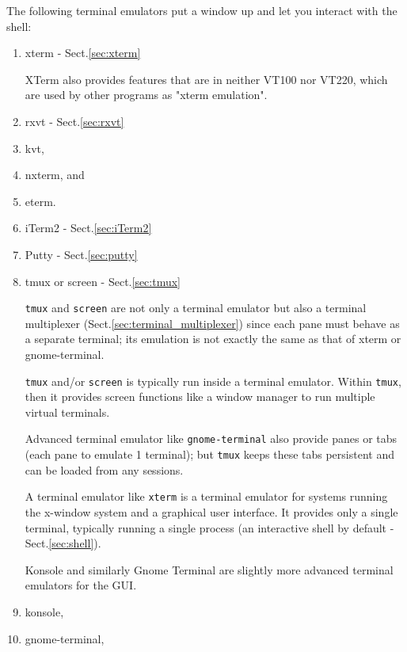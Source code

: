 The following terminal emulators put a window up and let you interact with
the shell: 
\begin{enumerate}
  \item xterm - Sect.\ref{sec:xterm}
  
  XTerm also provides features that are in neither VT100 nor VT220, which are
  used by other programs as "xterm emulation".

  
  \item rxvt - Sect.\ref{sec:rxvt}
  
  \item kvt, 
  
  \item nxterm, and 
  
  \item eterm.
  
  \item iTerm2 - Sect.\ref{sec:iTerm2}
  
  \item Putty - Sect.\ref{sec:putty}
  
  \item tmux or screen - Sect.\ref{sec:tmux}
  
  \verb!tmux! and \verb!screen! are not only a terminal emulator but also a
  terminal multiplexer (Sect.\ref{sec:terminal_multiplexer}) since each pane
  must behave as a separate terminal; its emulation is not exactly the same as
  that of xterm or gnome-terminal.

  \verb!tmux! and/or \verb!screen! is typically run inside a terminal emulator.
  Within \verb!tmux!, then it provides  screen functions like a window manager
  to run multiple virtual terminals.
  
  Advanced terminal emulator like \verb!gnome-terminal! also provide panes or
  tabs (each pane to emulate 1 terminal); but \verb!tmux! keeps these tabs
  persistent and can be loaded from any sessions.
  
  A terminal emulator like \verb!xterm! is a terminal emulator for systems
  running the x-window system and a graphical user interface. It provides only a
  single terminal, typically running a single process (an interactive shell by
  default - Sect.\ref{sec:shell}).
  
  Konsole and similarly Gnome Terminal are slightly more advanced terminal
  emulators for the GUI.

  \item konsole, 
  
  \item gnome-terminal, 
    
\end{enumerate}

